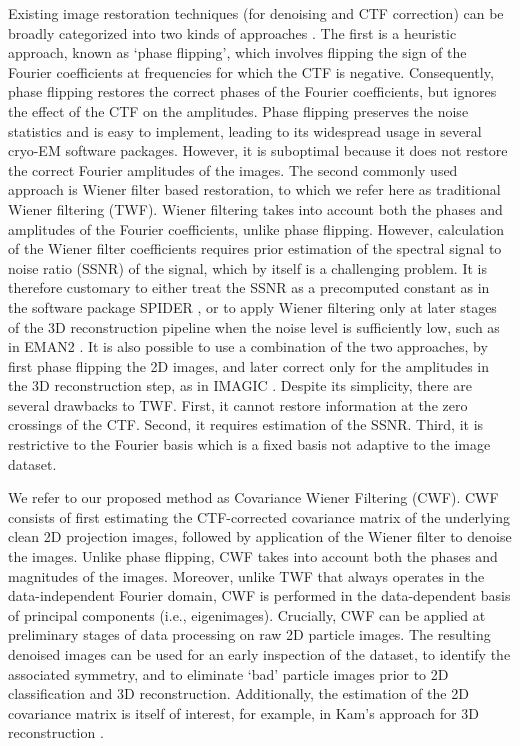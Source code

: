 \documentclass[review]{elsarticle}
\begin{document}
Existing image restoration techniques (for denoising and CTF correction) can be 
broadly categorized into two kinds of approaches \cite{Penczek_image}.
The first is a heuristic approach, known as `phase flipping', which involves 
flipping the sign of the Fourier coefficients at frequencies for which the CTF 
is negative.
Consequently, phase flipping restores the correct phases of the Fourier 
coefficients, but ignores the effect of the CTF on the
amplitudes. Phase flipping preserves the noise statistics and is easy to 
implement, leading to its widespread usage in several cryo-EM software packages.
However, it is suboptimal because it does not restore the correct
Fourier amplitudes of the images. The second commonly used approach is Wiener 
filter based restoration, to which we refer here as traditional Wiener filtering (TWF). 
Wiener filtering takes into account both the phases and amplitudes
of the Fourier coefficients, unlike phase flipping. However, calculation of the 
Wiener filter coefficients requires prior estimation
of the spectral signal to noise ratio (SSNR) of the signal, which by itself is a challenging 
problem. It is therefore customary to either
treat the SSNR as a precomputed constant as in the software package SPIDER 
\cite{spider}, or to
apply Wiener filtering only at later stages of the 3D reconstruction pipeline 
when the noise level is sufficiently low, such as in
EMAN2 \cite{eman2}. It is also possible to use a combination of the two 
approaches, by first phase flipping the 2D images,
and later correct only for the amplitudes in the 3D reconstruction step, as in 
IMAGIC \cite{imagic, imagic2}. Despite its simplicity,
there are several drawbacks to TWF. First, it cannot restore information at the 
zero 
crossings of the CTF. Second, it requires estimation of the SSNR. Third, it is
restrictive to the Fourier basis which is a fixed basis not adaptive to the 
image dataset.

We refer to our proposed method as Covariance
Wiener Filtering (CWF). CWF consists
of first estimating the CTF-corrected covariance matrix of the underlying clean 
2D projection images, followed by application of the Wiener filter
to denoise the images. Unlike phase flipping, CWF takes into 
account both the phases and magnitudes
of the images. Moreover, unlike TWF that always operates in the data-independent 
Fourier domain, CWF is performed in the data-dependent basis of principal 
components (i.e., eigenimages).
Crucially, CWF can be applied at preliminary
stages of data processing on raw 2D particle images. The resulting denoised 
images can be used for an early inspection of the dataset,
to identify the associated symmetry, and to eliminate `bad' particle images 
prior to 2D classification and 3D reconstruction. Additionally, the estimation 
of the
2D covariance matrix is itself of interest, for example, in Kam's approach for 
3D reconstruction \cite{kam1980, or}.
\end{document}
